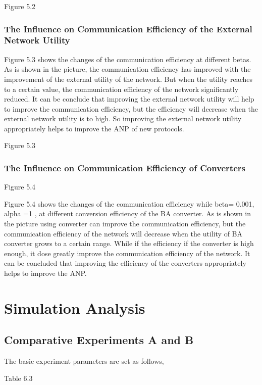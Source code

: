 \documentclass{article}
\begin{document}
Figure 5.2

\subsubsection{The Influence on Communication Efficiency of the External Network Utility}
Figure 5.3 shows the changes of the communication efficiency at different betas. As is shown in the picture, the communication
efficiency has improved with the improvement of the external utility of the network. But when the utility reaches to a certain
value, the communication efficiency of the network significantly reduced. It can be conclude that improving the external
network utility will help to improve the communication efficiency, but the efficiency will decrease when the external
network utility is to high. So improving the external network utility appropriately helps to improve the ANP of new protocols.

Figure 5.3

\subsubsection{The Influence on Communication Efficiency of Converters}
Figure 5.4

Figure 5.4 shows the changes of the communication efficiency while beta= 0.001, alpha =1 , at different conversion efficiency of
the BA converter. As is shown in the picture using converter can improve the communication efficiency, but the communication efficiency
of the network will decrease when the utility of BA converter grows to a certain range. While if the efficiency if the converter is
high enough, it dose greatly improve the communication efficiency of the network. It can be concluded that improving the efficiency
of the converters appropriately helps to improve the ANP.

\section{Simulation Analysis}
\subsection{Comparative Experiments A and B}
The basic experiment parameters are set as follows,

Table 6.3
\end{document}
